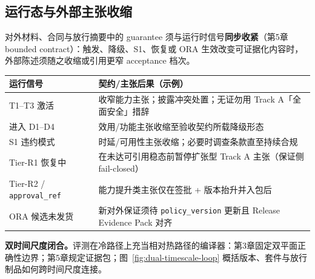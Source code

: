 \documentclass[11pt,a4paper]{report}
\begin{document}
\subsection*{运行态与外部主张收缩}
对外材料、合同与放行摘要中的 guarantee 须与运行时信号\textbf{同步收紧}（第5章 bounded contract）：触发、降级、S1、恢复或 ORA 生效改变可证据化内容时，外部陈述须随之收缩或引用更窄 acceptance 档次。

\begin{center}
\footnotesize
\begin{tabular}{@{}p{}p{}@{}}
\toprule
\textbf{运行信号} & \textbf{契约/主张后果（示例）} \\
\midrule
T1--T3 激活 & 收窄能力主张；披露冲突处置；无证勿用 Track A「全面安全」措辞 \\
进入 D1--D4 & 效用/功能主张收缩至验收契约所载降级形态 \\
S1 违约模式 & 时延/可用性主张收缩；必要时调查条款直至持续合规 \\
Tier-R1 恢复中 & 在未达可引用稳态前暂停扩张型 Track A 主张（保证侧 fail-closed） \\
Tier-R2 / \texttt{approval\_ref} & 能力提升类主张仅在签批 + 版本抬升并入包后 \\
ORA 候选未发货 & 新对外保证须待 \texttt{policy\_version} 更新且 Release Evidence Pack 对齐 \\
\bottomrule
\end{tabular}
\end{center}


\noindent\textbf{双时间尺度闭合。}评测在冷路径上充当相对热路径的编译器：第3章固定双平面正确性边界；第5章规定证据包；图~\ref{fig:dual-timescale-loop} 概括版本、套件与放行制品如何跨时间尺度连接。

\end{document}
